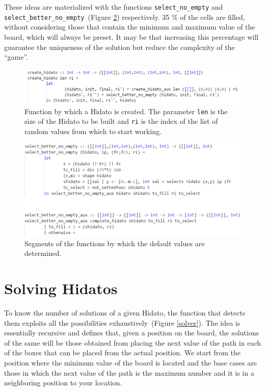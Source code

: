 \documentclass{llncs}
\begin{document}
These ideas are materialized with the functions \texttt{select\_no\_empty} and \texttt{select\_better\_no\_empty}~(Figure \ref{select}) respectively. 35 \% of the cells are filled, without considering those that contain the minimum and maximum value of the board, which will always be preset. It may be that increasing this percentage will guarantee the uniqueness of the solution but reduce the complexity of the ``game''.

\begin{figure}
\begin{center}
\includegraphics[width= 1\columnwidth]{figuras/createh}
\end{center}
\caption{Function by which a Hidato is created. The parameter \texttt{len} is the size of the Hidato to be built and \texttt{ri} is the index of the list of random values from which to start working.}
\label{create}
\end{figure}




\begin{figure}
\begin{center}
\includegraphics[width= 1\columnwidth]{figuras/select}
\end{center}
\caption{Segments of the functions by which the default values are determined.}
\label{select}
\end{figure}
\section{Solving Hidatos}
To know the number of solutions of a given Hidato, the function that detects them exploits all the possibilities exhaustively~(Figure \ref{solver}). The idea is essentially recursive and defines that, given a position on the board, the solutions of the same will be those obtained from placing the next value of the path in each of the boxes that can be placed from the actual position. We start from the position where the minimum value of the board is located and the base cases are those in which the next value of the path is the maximum number and it is in a neighboring position to your location.
\end{document}

